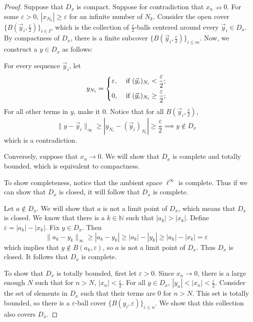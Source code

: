 \documentclass{article}
\theoremstyle{plain} %
\numberwithin{thm}{section} %
\theoremstyle{definition}
\begin{document}
        \begin{proof}
            Suppose that \(D_x\) is compact. Suppose for contradiction that \(x_n \nrightarrow 0\). For some \(\varepsilon > 0\), \(|x_{N_k}| \geq \varepsilon\) for an infinite number of \(N_k\). Consider the open cover \(\{B(\vec{y}_i, \frac{\varepsilon}{2})\}_{i\in I}\), which is the collection of \(\frac{\varepsilon}{2}\)-balls centered around every \(\vec{y}_i \in D_x\). By compactness of \(D_x\), there is a finite subcover \(\{B(\vec{y}_i, \frac{\varepsilon}{2})\}_{i \leq m}\). Now, we construct a \(y \in D_x\) as follows:

            For every sequence \(\vec{y}_i\), let
            \[
                y_{N_i} = \begin{dcases}
                    \varepsilon, &\text{ if } (\vec{y}_i)_{N_i} < \frac{\varepsilon}{2};\\
                    0, &\text{ if } (\vec{y}_i)_{N_i} \geq \frac{\varepsilon}{2} ;\\
                \end{dcases}
            \]
            For all other terms in \(y\), make it 0. Notice that for all \(B(\vec{y}_i, \frac{\varepsilon}{2})\),
            \[
                \|y-\vec{y}_i\|_\infty \geq |y_{N_i} - (\vec{y}_i)_{N_i}| \geq \frac{\varepsilon}{2} \implies y \notin D_x
            \]
            which is a contradiction.

            Conversely, suppose that \(x_n \rightarrow 0\). We will show that \(D_x\) is complete and totally bounded, which is equivalent to compactness.

            To show completeness, notice that the ambient space \(\ell ^{\infty}\) is complete. Thus if we can show that \(D_x\) is closed, it will follow that \(D_x\) is complete.

            Let \(a \notin D_x\). We will show that \(a\) is not a limit point of \(D_x\), which means that \(D_x\) is closed. We know that there is a \(k \in \mathbb{N}\) such that \(|a_k| > |x_k|\). Define \(\varepsilon = |a_k| - |x_k|\). Fix \(y \in D_x\). Then
            \[
                \|a_k - y_k\| _{\infty} \geq |a_k - y_k| \geq |a_k| - |y_k| \geq |a_k| - |x_k| = \varepsilon
            \]
            which implies that \(y \notin B(a_k, \varepsilon)\), so \(a\) is not a limit point of \(D_x\). Thus \(D_x\) is closed. It follows that \(D_x\) is complete.

            To show that \(D_x\) is totally bounded, first let \(\varepsilon > 0\). Since \(x_n \to 0\), there is a large enough \(N\) such that for \(n >N\), \(|x_n| < \frac{\varepsilon}{2}\). For all \(y \in D_x\), \(|y_n| < |x_n| < \frac{\varepsilon}{2}\). Consider the set of elements in \(D_x\) such that their terms are 0 for \(n > N\). This set is totally bounded, so there is a \(\varepsilon\)-ball cover \(\{B(y_i, \varepsilon)\}_{i \leq n}\). We show that this collection also covers \(D_x\).


\end{proof}
\end{document}
